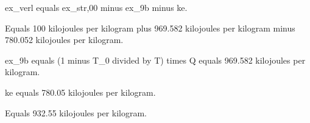 ex_verl equals ex_str,00 minus ex_9b minus ke.  

Equals 100 kilojoules per kilogram plus 969.582 kilojoules per kilogram minus 780.052 kilojoules per kilogram.  

ex_9b equals (1 minus T_0 divided by T) times Q equals 969.582 kilojoules per kilogram.  

ke equals 780.05 kilojoules per kilogram.  

Equals 932.55 kilojoules per kilogram.